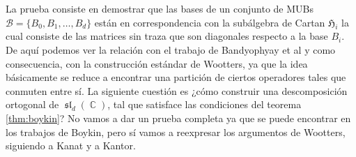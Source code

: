 \documentclass[a4paper]{report}
\DeclareMathOperator{\C}{\mathbb{C}}
\DeclareMathOperator{\Sl}{\mathfrak{sl}}
\begin{document}
  La prueba consiste en demostrar que las bases de un
  conjunto de MUBs $\mathcal B = \{B_0,B_1,\ldots,B_d\}$ 
  están en correspondencia con la subálgebra de Cartan
  $\mathfrak{H}_i$ la cual consiste de las matrices sin
  traza que son diagonales respecto a la base $B_i$. De aquí
  podemos ver la relación con el trabajo de Bandyophyay et
  al y como consecuencia, con la construcción estándar de
  Wootters, ya que la idea básicamente se reduce a encontrar
  una partición de ciertos operadores tales que conmuten
  entre sí. La siguiente cuestión es ¿cómo construir una
  descomposición ortogonal de $\Sl_d(\C)$, tal que satisface
  las condiciones del teorema \ref{thm:boykin}? No vamos a
  dar un prueba completa ya que se puede encontrar en los
  trabajos de Boykin, pero sí vamos a reexpresar los
  argumentos de Wootters, siguiendo a Kanat y a Kantor.
  
\end{document}
